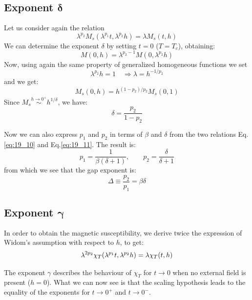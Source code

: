 \documentclass[../main/main.tex]{subfiles}
\begin{document}
\subsection{Exponent \( \pmb{\delta}  \)}
Let us consider again the relation
\begin{equation*}
   \lambda ^{p_2} M_s ( \lambda ^{p_1} t, \lambda ^{p_2} h) = \lambda M_s (t,h)
\end{equation*}
We can determine the exponent \( \delta  \) by setting \( t=0 \) (\( T=T_c  \)), obtaining:
\begin{equation*}
  M(0,h) = \lambda ^{p_2-1} M (0, \lambda ^{p_2} h)
\end{equation*}
Now, using again the same property of generalized homogeneous functions we set
\begin{equation*}
  \lambda ^{p_2} h = 1 \quad \Rightarrow \lambda = h^{-1/p_2}
\end{equation*}
and we get:
\begin{equation*}
  M_s (0,h) =  h^{(1-p_2)/p_2} M_s (0,1)
\end{equation*}
Since \(  M_s  \overset{h \rightarrow 0^+}{\sim} h^{1/\delta } \), we have:
\begin{equation}
  \delta = \frac{p_2}{ 1 - p_2 }
  \label{eq:19_11}
\end{equation}

Now we can also express \( p_1 \) and \( p_2 \)  in terms of \( \beta  \) and \( \delta  \) from the two relations Eq.\eqref{eq:19_10} and Eq.\eqref{eq:19_11}. The result is:
\begin{equation}
  p_1 = \frac{1}{\beta (\delta +1)}, \qquad p_2 = \frac{\delta }{\delta + 1}
\end{equation}
from which we see that the gap exponent is:
\begin{equation}
  \Delta \equiv \frac{p_2}{p_1}  = \beta \delta
\end{equation}


\subsection{Exponent \( \pmb{\gamma  } \) }
In order to obtain the magnetic susceptibility, we derive twice the expression of Widom's assumption with respect to \( h \), to get:
\begin{equation*}
  \lambda ^{2p_2} \chi _T \qty(\lambda ^{p_1}t, \lambda ^{p_2}h) = \lambda \chi _T (t,h)
\end{equation*}

The exponent \( \gamma   \) describes the behaviour of \( \chi _T \)  for \( t \rightarrow 0 \)  when no external field is present (\( h=0 \)). What we can now see is that the scaling hypothesis leads to the equality of the exponents for \( t \rightarrow 0^+ \)  and \( t \rightarrow 0^- \).
\end{document}

